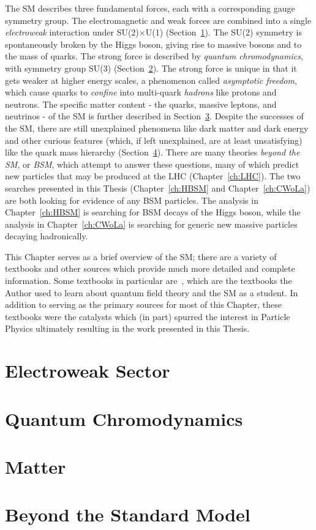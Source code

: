 The SM describes three fundamental forces, each with a corresponding gauge symmetry group.
The electromagnetic and weak forces are combined into a single \textit{electroweak} interaction under SU(2)$\times$U(1) (Section~\ref{sec:SM:EW}). 
The SU(2) symmetry is spontaneously broken by the Higgs boson, giving rise to massive bosons and to the mass of quarks.
The strong force is described by \textit{quantum chromodynamics}, with symmetry group SU(3) (Section~\ref{sec:SM:QCD}).
The strong force is unique in that it gets weaker at higher energy scales, a phenomenon called \textit{asymptotic freedom}, which cause quarks to \textit{confine} into multi-quark \textit{hadrons} like protons and neutrons.
The specific matter content - the quarks, massive leptons, and neutrinos - of the SM is further described in Section~\ref{sec:SM:matter}.
Despite the successes of the SM, there are still unexplained phenomena like dark matter and dark energy and other curious features (which, if left unexplained, are at least unsatisfying) like the quark mass hierarchy (Section~\ref{sec:SM:BSM}).
There are many theories \textit{beyond the SM}, or \textit{BSM}, which attempt to answer these questions, many of which predict new particles that may be produced at the LHC (Chapter~\ref{ch:LHC}).
The two searches presented in this Thesis (Chapter~\ref{ch:HBSM} and Chapter~\ref{ch:CWoLa}) are both looking for evidence of any BSM particles.
The analysis in Chapter~\ref{ch:HBSM} is searching for BSM decays of the Higgs boson, while the analysis in Chapter~\ref{ch:CWoLa} is searching for generic new massive particles decaying hadronically.

This Chapter serves as a brief overview of the SM; there are a variety of textbooks and other sources which provide much more detailed and complete information.
Some textbooks in particular are~\cite{Schwartz:2013pla,Peskin:1995ev,Weinberg:1995mt,griffiths_particles}, which are the textbooks the Author used to learn about quantum field theory and the SM as a student.
In addition to serving as the primary sources for most of this Chapter, these textbooks were the catalysts which (in part) spurred the interest in Particle Physics ultimately resulting in the work presented in this Thesis.

\section{Electroweak Sector}
\label{sec:SM:EW}
\section{Quantum Chromodynamics}
\label{sec:SM:QCD}
\section{Matter}
\label{sec:SM:matter}
\section{Beyond the Standard Model}
\label{sec:SM:BSM}
